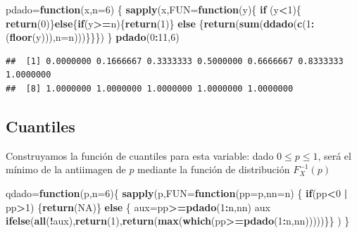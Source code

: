 \documentclass[]{book}
\newenvironment{Shaded}{\begin{snugshade}}{\end{snugshade}}
\newcommand{\ControlFlowTok}[1]{\textcolor[rgb]{0.13,0.29,0.53}{\textbf{#1}}}
\newcommand{\DataTypeTok}[1]{\textcolor[rgb]{0.13,0.29,0.53}{#1}}
\newcommand{\DecValTok}[1]{\textcolor[rgb]{0.00,0.00,0.81}{#1}}
\newcommand{\KeywordTok}[1]{\textcolor[rgb]{0.13,0.29,0.53}{\textbf{#1}}}
\newcommand{\NormalTok}[1]{#1}
\newcommand{\OperatorTok}[1]{\textcolor[rgb]{0.81,0.36,0.00}{\textbf{#1}}}
\newcommand{\OtherTok}[1]{\textcolor[rgb]{0.56,0.35,0.01}{#1}}
\newcommand{\StringTok}[1]{\textcolor[rgb]{0.31,0.60,0.02}{#1}}
\begin{document}
\begin{Shaded}
\begin{Highlighting}[]
\NormalTok{pdado=}\ControlFlowTok{function}\NormalTok{(x,}\DataTypeTok{n=}\DecValTok{6}\NormalTok{) }
\NormalTok{  \{}
  \KeywordTok{sapply}\NormalTok{(x,}\DataTypeTok{FUN=}\ControlFlowTok{function}\NormalTok{(y)\{ }\ControlFlowTok{if}\NormalTok{ (y}\OperatorTok{<}\DecValTok{1}\NormalTok{)\{ }\KeywordTok{return}\NormalTok{(}\DecValTok{0}\NormalTok{)\}}\ControlFlowTok{else}\NormalTok{\{}\ControlFlowTok{if}\NormalTok{(y}\OperatorTok{>=}\NormalTok{n)\{}\KeywordTok{return}\NormalTok{(}\DecValTok{1}\NormalTok{)\} }\ControlFlowTok{else}
\NormalTok{  \{}\KeywordTok{return}\NormalTok{(}\KeywordTok{sum}\NormalTok{(}\KeywordTok{ddado}\NormalTok{(}\KeywordTok{c}\NormalTok{(}\DecValTok{1}\OperatorTok{:}\NormalTok{(}\KeywordTok{floor}\NormalTok{(y))),}\DataTypeTok{n=}\NormalTok{n)))\}\}\})}
\NormalTok{  \}}
\KeywordTok{pdado}\NormalTok{(}\DecValTok{0}\OperatorTok{:}\DecValTok{11}\NormalTok{,}\DecValTok{6}\NormalTok{)}
\end{Highlighting}
\end{Shaded}

\begin{verbatim}
##  [1] 0.0000000 0.1666667 0.3333333 0.5000000 0.6666667 0.8333333 1.0000000
##  [8] 1.0000000 1.0000000 1.0000000 1.0000000 1.0000000
\end{verbatim}

\hypertarget{cuantiles-7}{%
\subsection{Cuantiles}\label{cuantiles-7}}

Construyamos la función de cuantiles para esta variable: dado \(0\leq p \leq 1\), será el mínimo de la antiimagen de \(p\) mediante la función de distribución \(F_X^{-1}(p)\)

\begin{Shaded}
\begin{Highlighting}[]
\NormalTok{qdado=}\ControlFlowTok{function}\NormalTok{(p,}\DataTypeTok{n=}\DecValTok{6}\NormalTok{)\{}
\KeywordTok{sapply}\NormalTok{(p,}\DataTypeTok{FUN=}\ControlFlowTok{function}\NormalTok{(}\DataTypeTok{pp=}\NormalTok{p,}\DataTypeTok{nn=}\NormalTok{n) }
\NormalTok{  \{}
  \ControlFlowTok{if}\NormalTok{(pp}\OperatorTok{<}\DecValTok{0} \OperatorTok{|}\StringTok{ }\NormalTok{pp}\OperatorTok{>}\DecValTok{1}\NormalTok{) \{}\KeywordTok{return}\NormalTok{(}\OtherTok{NA}\NormalTok{)\}}
  \ControlFlowTok{else}\NormalTok{ \{}
\NormalTok{  aux=pp}\OperatorTok{>=}\KeywordTok{pdado}\NormalTok{(}\DecValTok{1}\OperatorTok{:}\NormalTok{n,nn)}
\NormalTok{  aux}
  \KeywordTok{ifelse}\NormalTok{(}\KeywordTok{all}\NormalTok{(}\OperatorTok{!}\NormalTok{aux),}\KeywordTok{return}\NormalTok{(}\DecValTok{1}\NormalTok{),}\KeywordTok{return}\NormalTok{(}\KeywordTok{max}\NormalTok{(}\KeywordTok{which}\NormalTok{(pp}\OperatorTok{>=}\KeywordTok{pdado}\NormalTok{(}\DecValTok{1}\OperatorTok{:}\NormalTok{n,nn)))))\}\}}
\NormalTok{)}
\NormalTok{\}}
\end{Highlighting}
\end{Shaded}
\end{document}

